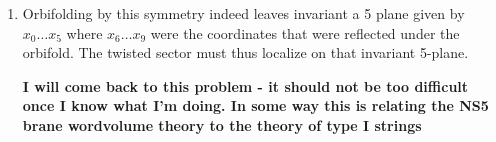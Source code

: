 \documentclass[11pt, class=article, crop=false]{standalone}
\begin{document}
\begin{enumerate}
	\item Orbifolding by this symmetry indeed leaves invariant a 5 plane given by $x_0 \dots x_5$ where $x_6 \dots x_9$ were the coordinates that were reflected under the orbifold. The twisted sector must thus localize on that invariant 5-plane. 
	
	\textbf{I will come back to this problem - it should not be too difficult once I know what I'm doing. In some way this is relating the NS5 brane wordvolume theory to the theory of type I strings}
	
		
\end{enumerate}

\end{document}
